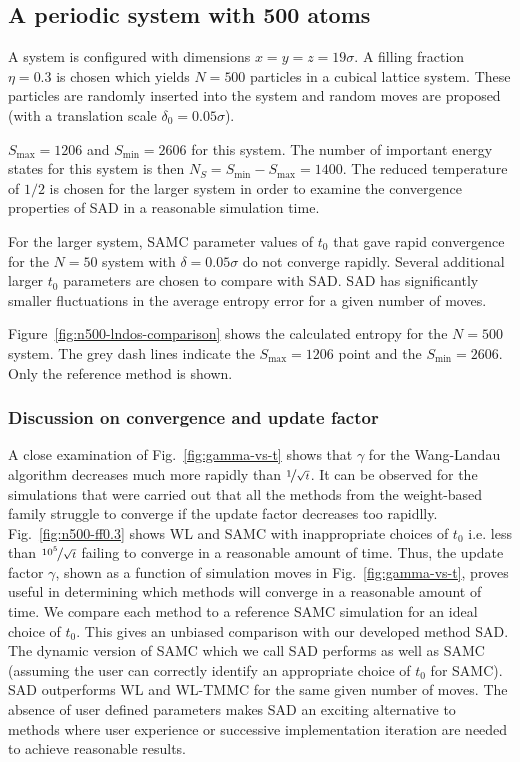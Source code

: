 \documentclass[letterpaper,twocolumn,amsmath,amssymb,pre,aps,10pt]{revtex4-1}
\begin{document}
\subsection{A periodic system with 500 atoms}

A system is configured with dimensions $x = y = z = 19\sigma$.  A
filling fraction $\eta = 0.3$ is chosen which yields $N = 500$
particles in a cubical lattice system.  These particles are randomly
inserted into the system and random moves are proposed (with a
translation scale $\delta_0 = 0.05\sigma$).

{\color{red}
$S_{\max} = 1206$ and $S_{\min} = 2606$ for this system.  The number of
important energy states for this system is then $N_S = S_{\min} -
S_{\max} = 1400$. The reduced temperature of $1/2$ is chosen for the
larger system in order to examine the convergence properties of SAD in
a reasonable simulation time.
}

For the larger system, SAMC parameter values of $t_0$ that gave rapid
convergence for the $N = 50$ system with $\delta = 0.05\sigma$ do not
converge rapidly.  Several additional larger $t_0$ parameters are
chosen to compare with SAD.  SAD has significantly smaller fluctuations
in the average entropy error for a given number of moves.

{\color{red}
Figure~\ref{fig:n500-lndos-comparison} shows the calculated entropy for
the $N = 500$ system. The grey dash lines indicate the $S_{\max} = 1206$
point and the $S_{\min} = 2606$. Only the reference method is shown.
}

\subsubsection{Discussion on convergence and update factor}

A close examination of Fig.~\ref{fig:gamma-vs-t} shows that $\gamma$
for the Wang-Landau algorithm decreases much more rapidly than
$\nicefrac{1}{\sqrt{t}}$. It can be observed  for the simulations that
were carried out that all the methods from the weight-based family
struggle to converge if the update factor decreases too rapidlly.
Fig.~\ref{fig:n500-ff0.3} shows WL and SAMC with inappropriate choices
of $t_0$ i.e. less than $\nicefrac{10^5}{\sqrt{t}}$ failing to converge
in a reasonable amount of time. Thus, the update factor $\gamma$, shown
as a function of simulation moves in Fig.~\ref{fig:gamma-vs-t}, proves
useful in determining which methods will converge in a reasonable
amount of time. We compare each method to a reference SAMC
simulation for an ideal choice of $t_0$.  This gives an unbiased
comparison with our developed method SAD. The dynamic version of SAMC
which we call SAD performs as well as SAMC (assuming the user can
correctly identify an appropriate choice of $t_0$ for SAMC).  SAD
outperforms WL and WL-TMMC for the same given number of moves. The
absence of user defined parameters makes SAD an exciting alternative to
methods where user experience or successive implementation iteration
are needed to achieve reasonable results.
\end{document}
